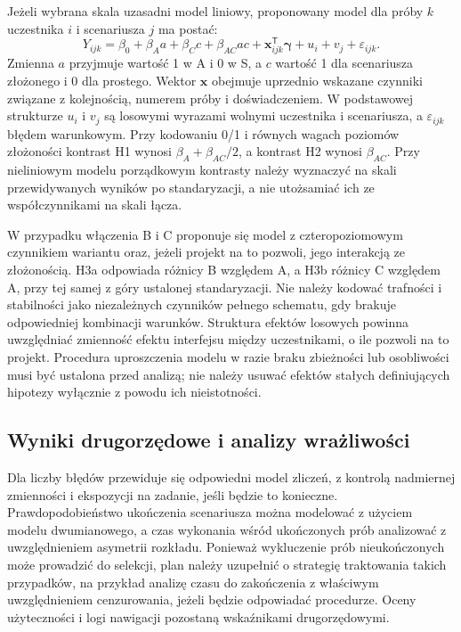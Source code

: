 \documentclass[11pt,a4paper]{article}
\begin{document}
Jeżeli wybrana skala uzasadni model liniowy, proponowany model dla próby $k$ uczestnika $i$ i scenariusza $j$ ma postać:
\[
Y_{ijk}=\beta_0+\beta_A a+\beta_C c+\beta_{AC}ac
+\boldsymbol{x}_{ijk}^{\mathsf T}\boldsymbol{\gamma}
+u_i+v_j+\varepsilon_{ijk}.
\]
Zmienna $a$ przyjmuje wartość 1 w A i 0 w S, a $c$ wartość 1 dla scenariusza złożonego i 0 dla prostego. Wektor $\boldsymbol{x}$ obejmuje uprzednio wskazane czynniki związane z kolejnością, numerem próby i doświadczeniem. W podstawowej strukturze $u_i$ i $v_j$ są losowymi wyrazami wolnymi uczestnika i scenariusza, a $\varepsilon_{ijk}$ błędem warunkowym. Przy kodowaniu 0/1 i równych wagach poziomów złożoności kontrast H1 wynosi $\beta_A+\beta_{AC}/2$, a kontrast H2 wynosi $\beta_{AC}$. Przy nieliniowym modelu porządkowym kontrasty należy wyznaczyć na skali przewidywanych wyników po standaryzacji, a nie utożsamiać ich ze współczynnikami na skali łącza.

W przypadku włączenia B i C proponuje się model z czteropoziomowym czynnikiem wariantu oraz, jeżeli projekt na to pozwoli, jego interakcją ze złożonością. H3a odpowiada różnicy B względem A, a H3b różnicy C względem A, przy tej samej z góry ustalonej standaryzacji. Nie należy kodować trafności i stabilności jako niezależnych czynników pełnego schematu, gdy brakuje odpowiedniej kombinacji warunków. Struktura efektów losowych powinna uwzględniać zmienność efektu interfejsu między uczestnikami, o ile pozwoli na to projekt. Procedura uproszczenia modelu w razie braku zbieżności lub osobliwości musi być ustalona przed analizą; nie należy usuwać efektów stałych definiujących hipotezy wyłącznie z powodu ich nieistotności.

\subsection{Wyniki drugorzędowe i analizy wrażliwości}

Dla liczby błędów przewiduje się odpowiedni model zliczeń, z kontrolą nadmiernej zmienności i ekspozycji na zadanie, jeśli będzie to konieczne. Prawdopodobieństwo ukończenia scenariusza można modelować z użyciem modelu dwumianowego, a czas wykonania wśród ukończonych prób analizować z uwzględnieniem asymetrii rozkładu. Ponieważ wykluczenie prób nieukończonych może prowadzić do selekcji, plan należy uzupełnić o strategię traktowania takich przypadków, na przykład analizę czasu do zakończenia z właściwym uwzględnieniem cenzurowania, jeżeli będzie odpowiadać procedurze. Oceny użyteczności i logi nawigacji pozostaną wskaźnikami drugorzędowymi.
\end{document}
